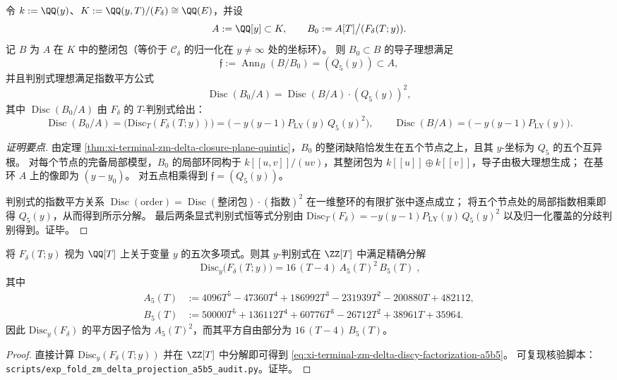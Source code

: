 \begin{proposition}[整闭包导子与判别式的指数平方分解]\label{prop:xi-terminal-zm-delta-conductor-q5-and-discriminant-index-square}
令 \(k:=\QQ(y)\)、\(K:=\QQ(y,T)/(F_\delta)\cong \QQ(E)\)，并设
\[
A:=\QQ[y]\subset K,\qquad
B_0:=A[T]\big/(F_\delta(T;y)).
\]
记 \(B\) 为 \(A\) 在 \(K\) 中的整闭包（等价于 \(\mathcal C_\delta\) 的归一化在 \(y\neq\infty\) 处的坐标环）。
则 \(B_0\subset B\) 的导子理想满足
\[
\mathfrak f:=\operatorname{Ann}_{B}(B/B_0)=(Q_5(y))\subset A,
\]
并且判别式理想满足指数平方公式
\[
\operatorname{Disc}(B_0/A)=\operatorname{Disc}(B/A)\cdot (Q_5(y))^2,
\]
其中 \(\operatorname{Disc}(B_0/A)\) 由 \(F_\delta\) 的 \(T\)-判别式给出：
\[
\operatorname{Disc}(B_0/A)=\bigl(\mathrm{Disc}_T(F_\delta(T;y))\bigr)
=\bigl(-y(y-1)P_{\mathrm{LY}}(y)\,Q_5(y)^2\bigr),
\qquad
\operatorname{Disc}(B/A)=\bigl(-y(y-1)P_{\mathrm{LY}}(y)\bigr).
\]
\end{proposition}

\begin{proof}[证明要点]
由定理 \ref{thm:xi-terminal-zm-delta-closure-plane-quintic}，\(B_0\) 的整闭缺陷恰发生在五个节点之上，且其 \(y\)-坐标为 \(Q_5\) 的五个互异根。
对每个节点的完备局部模型，\(B_0\) 的局部环同构于 \(k[[u,v]]/(uv)\)，其整闭包为 \(k[[u]]\oplus k[[v]]\)，导子由极大理想生成；
在基环 \(A\) 上的像即为 \((y-y_0)\)。
对五点相乘得到 \(\mathfrak f=(Q_5(y))\)。

判别式的指数平方关系 \(\operatorname{Disc}(\text{order})=\operatorname{Disc}(\text{整闭包})\cdot (\text{指数})^2\) 在一维整环的有限扩张中逐点成立；
将五个节点处的局部指数相乘即得 \(Q_5(y)\)，从而得到所示分解。
最后两条显式判别式恒等式分别由
\(\mathrm{Disc}_T(F_\delta)=-y(y-1)P_{\mathrm{LY}}(y)\,Q_5(y)^2\)
以及归一化覆盖的分歧判别得到。证毕。
\end{proof}

\begin{proposition}\label{prop:xi-terminal-zm-delta-discy-factorization-a5b5}
将 \(F_\delta(T;y)\) 视为 \(\QQ[T]\) 上关于变量 \(y\) 的五次多项式。则其 \(y\)-判别式在 \(\ZZ[T]\) 中满足精确分解
\begin{equation}\label{eq:xi-terminal-zm-delta-discy-factorization-a5b5}
\boxed{\;
\mathrm{Disc}_{y}\!\bigl(F_\delta(T;y)\bigr)
=16\,(T-4)\,A_5(T)^2\,B_5(T)\; } ,
\end{equation}
其中
\[
\begin{aligned}
A_5(T)
&:=4096T^5-47360T^4+186992T^3-231939T^2-200880T+482112,\\
B_5(T)
&:=50000T^5+136112T^4+60776T^3-26712T^2+38961T+35964.
\end{aligned}
\]
因此 \(\mathrm{Disc}_{y}(F_\delta)\) 的平方因子恰为 \(A_5(T)^2\)，而其平方自由部分为 \(16\,(T-4)\,B_5(T)\)。
\end{proposition}
\begin{proof}
直接计算 \(\mathrm{Disc}_{y}(F_\delta(T;y))\) 并在 \(\ZZ[T]\) 中分解即可得到 \eqref{eq:xi-terminal-zm-delta-discy-factorization-a5b5}。
可复现核验脚本：\texttt{scripts/exp\_fold\_zm\_delta\_projection\_a5b5\_audit.py}。证毕。
\end{proof}

